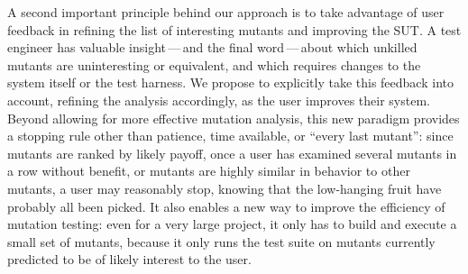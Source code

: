 A second important principle behind our approach is to take advantage of user
feedback in refining the list of interesting mutants and improving the SUT.
A test engineer has valuable insight\,---\,and the final word\,---\,about which
unkilled mutants are uninteresting or equivalent, and which requires changes to
the system itself or the test harness.  We propose to explicitly take this
feedback into account, refining the analysis accordingly, as the user improves
their system.  Beyond allowing for more effective mutation analysis,
this new paradigm provides a stopping rule other than patience, time available, or
``every last mutant'':  since mutants are ranked by likely payoff, once a user
has examined several mutants in a row without benefit, or mutants are highly
similar in behavior to other mutants, a user may reasonably stop, knowing that
the low-hanging fruit have probably all been picked.
 It also enables a new way to improve the efficiency of
mutation testing:  even for a very large project, it only has to build and
execute a small set of mutants, because it only runs the test suite on mutants
currently predicted to be of likely interest to the user.

